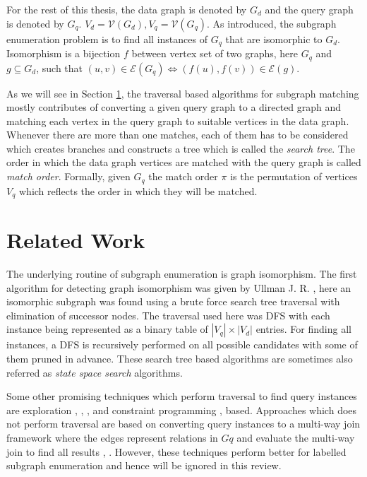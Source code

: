 For the rest of this thesis, the data graph is denoted by $G_d$ and the query graph is denoted by $G_q$. $V_d =  \mathcal{V}(G_d), V_q = \mathcal{V}(G_q)$.
As introduced, the subgraph enumeration problem is to find all instances of $G_q$ that are isomorphic to $G_d$.
Isomorphism is a bijection $f$ between vertex set of two graphs, here $G_q$ and $g \subseteq G_d$, such that $ (u,v) \in \mathcal{E}(G_q) \Leftrightarrow (f(u), f(v)) \in \mathcal{E}(g)$.

As we will see in Section \ref{sec:LIT-r}, the traversal based algorithms for subgraph matching mostly contributes of converting a given query graph to a directed graph and matching each vertex in the query graph to suitable vertices in the data graph. Whenever there are more than one matches, each of them has to be considered which creates branches and constructs a tree which is called the \textit{search tree}.
The order in which the data graph vertices are matched with the query graph is called \textit{match order}. Formally, given $G_q$ the match order $\pi$ is the permutation of vertices $V_q$ which reflects the order in which they will be matched.

\section{Related Work} \label{sec:LIT-r}
The underlying routine of subgraph enumeration is graph isomorphism.
The first algorithm for detecting graph isomorphism was given by Ullman J. R. \cite{ullman_sgm}, here an isomorphic subgraph was found using a brute force search tree traversal with elimination of successor nodes.
The traversal used here was DFS with each instance being represented as a binary table of $|V_q|\times |V_d|$ entries.
For finding all instances, a DFS is recursively performed on all possible candidates with some of them pruned in advance.
These search tree based algorithms are sometimes also referred as \textit{state space search} algorithms.

Some other promising techniques which perform traversal to find query instances are exploration \cite{expl-based1}, \cite{expl-based2}, \cite{expl-based3}, \cite{expl-based4} and constraint programming \cite{cp-based-sgm1}, \cite{cp-based-sgm2} based.
Approaches which does not perform traversal are based on converting query instances to a multi-way join framework where the edges represent relations in $Gq$ and evaluate the multi-way join to find all results \cite{mapreduce}, \cite{mapreduce-dist}.
However, these techniques perform better for labelled subgraph enumeration \cite{sgm-techniques} and hence will be ignored in this review.

